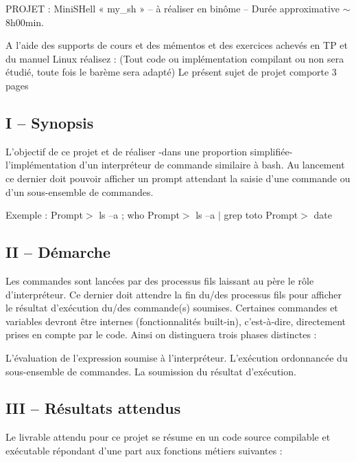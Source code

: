 P\+R\+O\+J\+ET \+: Mini\+S\+Hell « my\+\_\+sh » – à réaliser en binôme – Durée approximative $\sim$ 8h00min.

A l’aide des supports de cours et des mémentos et des exercices achevés en TP et du manuel Linux réalisez \+: (Tout code ou implémentation compilant ou non sera étudié, toute fois le barème sera adapté) Le présent sujet de projet comporte 3 pages

\subsection*{I – Synopsis}

L’objectif de ce projet et de réaliser -\/dans une proportion simplifiée-\/ l’implémentation d’un interpréteur de commande similaire à bash. Au lancement ce dernier doit pouvoir afficher un prompt attendant la saisie d’une commande ou d’un sous-\/ensemble de commandes.

Exemple \+: Prompt$>$ ls –a ; who Prompt$>$ ls –a $\vert$ grep toto Prompt$>$ date

\subsection*{II – Démarche}

Les commandes sont lancées par des processus fils laissant au père le rôle d’interpréteur. Ce dernier doit attendre la fin du/des processus fils pour afficher le résultat d’exécution du/des commande(s) soumises. Certaines commandes et variables devront être internes (fonctionnalités built-\/in), c’est-\/à-\/dire, directement prises en compte par le code. Ainsi on distinguera trois phases distinctes \+: \begin{DoxyVerb}L’évaluation de l’expression soumise à l’interpréteur.
L’exécution ordonnancée du sous-ensemble de commandes.
La soumission du résultat d’exécution.
\end{DoxyVerb}


\subsection*{I\+II – Résultats attendus}

Le livrable attendu pour ce projet se résume en un code source compilable et exécutable répondant d’une part aux fonctions métiers suivantes \+:


